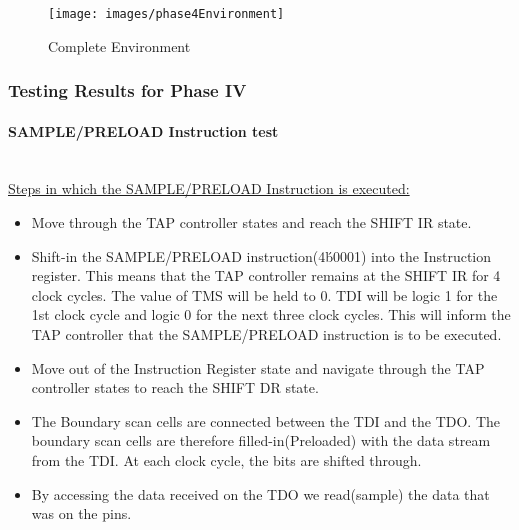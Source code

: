 \documentclass[a4paper,11pt]{article}
\begin{document}
\begin{figure}[ht]
\centering
\texttt{[image: images/phase4Environment]}
\caption{Complete Environment }
\end{figure}

\subsubsection{Testing Results for Phase IV}
\paragraph{SAMPLE/PRELOAD Instruction test}\mbox{}\\
\underline{Steps in which the SAMPLE/PRELOAD Instruction is executed:}
\begin{itemize}[noitemsep]
\item Move through the TAP controller states and reach the SHIFT IR state.
\item Shift-in the SAMPLE/PRELOAD instruction(4\'b0001) into the Instruction register. This means that the TAP controller remains at the SHIFT IR for 4 clock cycles. The value of TMS will be held to 0. TDI will be logic 1 for the 1st clock cycle and logic 0 for the next three clock cycles. This will inform the TAP controller that the SAMPLE/PRELOAD instruction is to be executed.
\item Move out of the Instruction Register state and navigate through the TAP controller states to reach the SHIFT DR state.
\item The Boundary scan cells are connected between the TDI and the TDO. The boundary scan cells are therefore filled-in(Preloaded) with the data stream from the TDI. At each clock cycle, the bits are shifted through. 
\item By accessing the data received on the TDO we read(sample) the data that was on the pins.
\end{itemize}
\end{document}
